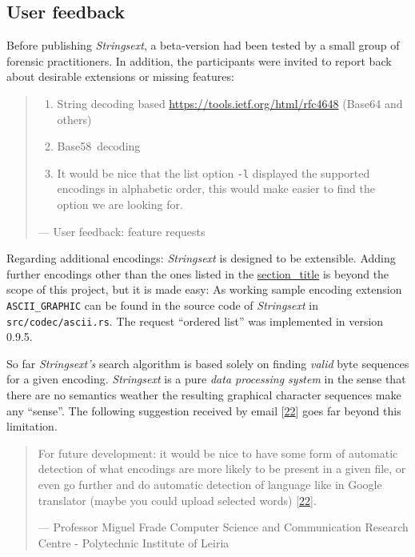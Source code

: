 \subsection{User feedback}\label{_user_feedback}

Before publishing \emph{Strings­ext}, a beta-version had been tested by
a small group of forensic practitioners. In addition, the participants
were invited to report back about desirable extensions or missing
features:

\begin{quote}
\begin{enumerate}
\def\labelenumi{\arabic{enumi}.}
\item
  String decoding based \url{https://tools.ietf.org/html/rfc4648}
  (Base64 and others)~
\item
  Base58~decoding~
\item
  It would be nice that the list option \texttt{-l} displayed the
  supported encodings in alphabetic order, this would make easier to
  find the option we are looking for.
\end{enumerate}

---  User feedback: feature requests
\end{quote}

Regarding additional encodings: \emph{Strings­ext} is designed to be
extensible. Adding further encodings other than the ones listed in the
\protect\hyperlink{decoder}{section\_title} is beyond the scope of this
project, but it is made easy: As working sample encoding extension
\texttt{ASCII\_GRAPHIC} can be found in the source code of
\emph{Strings­ext} in \texttt{src/codec/ascii.rs}. The request ``ordered
list'' was implemented in version 0.9.5.

So far \emph{Strings­ext's} search algorithm is based solely on finding
\emph{valid} byte sequences for a given encoding. \emph{Strings­ext} is
a pure \emph{data processing system} in the sense that there are no
semantics weather the resulting graphical character sequences make any
``sense''. The following suggestion received by email
{[}\protect\hyperlink{frade2016}{22}{]} goes far beyond this limitation.

\begin{quote}
For future development: it would be nice to have some form of automatic
detection of what encodings are more likely to be present in a given
file, or even go further and do automatic detection of language like in
Google translator (maybe you could upload selected words)
{[}\protect\hyperlink{frade2016}{22}{]}.

---  Professor Miguel Frade Computer Science and Communication Research
Centre - Polytechnic Institute of Leiria
\end{quote}

